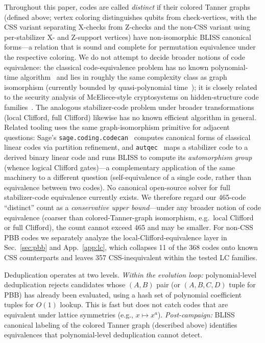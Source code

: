 \documentclass[aps,prxquantum,twocolumn,superscriptaddress,nofootinbib]{revtex4-2}
\begin{document}
Throughout this paper, codes are called \emph{distinct} if their colored Tanner graphs (defined above; vertex coloring distinguishes qubits from check-vertices, with the CSS variant separating X-checks from Z-checks and the non-CSS variant using per-stabilizer X- and Z-support vertices) have non-isomorphic BLISS canonical forms---a relation that is sound and complete for permutation equivalence under the respective coloring.
We do not attempt to decide broader notions of code equivalence: the classical code-equivalence problem has no known polynomial-time algorithm~\cite{petrank1997code} and lies in roughly the same complexity class as graph isomorphism (currently bounded by quasi-polynomial time~\cite{babai2016graph}); it is closely related to the security analysis of McEliece-style cryptosystems on hidden-structure code families~\cite{mceliece1978public,sendrier2000finding}.
The analogous stabilizer-code problem under broader transformations (local Clifford, full Clifford) likewise has no known efficient algorithm in general.
Related tooling uses the same graph-isomorphism primitive for adjacent questions: Sage's \texttt{sage.coding.codecan}~\cite{feulner2009canonical} computes canonical forms of classical linear codes via partition refinement, and \texttt{autqec}~\cite{sayginel2024fault} maps a stabilizer code to a derived binary linear code and runs BLISS to compute its \emph{automorphism group} (whence logical Clifford gates)---a complementary application of the same machinery to a different question (self-equivalence of a single code, rather than equivalence between two codes).
No canonical open-source solver for full stabilizer-code equivalence currently exists.
We therefore regard our 465-code ``distinct'' count as a \emph{conservative upper bound}---under any broader notion of code equivalence (coarser than colored-Tanner-graph isomorphism, e.g.\ local Clifford or full Clifford), the count cannot exceed 465 and may be smaller.
For non-CSS PBB codes we separately analyze the local-Clifford-equivalence layer in Sec.~\ref{sec:pbb} and App.~\ref{app:lc}, which collapses 11 of the 368 codes onto known CSS counterparts and leaves 357 CSS-inequivalent within the tested LC families.

Deduplication operates at two levels.
\emph{Within the evolution loop:} polynomial-level deduplication rejects candidates whose $(A, B)$ pair (or $(A, B, C, D)$ tuple for PBB) has already been evaluated, using a hash set of polynomial coefficient tuples for $O(1)$ lookup.
This is fast but does not catch codes that are equivalent under lattice symmetries (e.g., $x \mapsto x^a$).
\emph{Post-campaign:} BLISS canonical labeling of the colored Tanner graph (described above) identifies equivalences that polynomial-level deduplication cannot detect.
\end{document}
